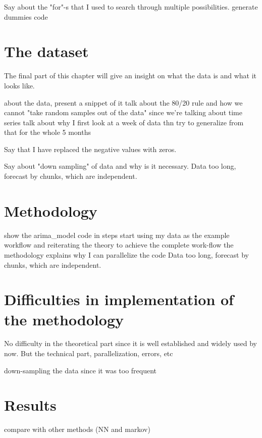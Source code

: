 \documentclass[12pt,a4paper,titlepage]{report}
\begin{document}
Say about the "for"-s that I used to search through multiple possibilities.
generate dummies code


\section{The dataset}
The final part of this chapter will give an insight on what the data is and what it looks like.

about the data, present a snippet of it
talk about the 80/20 rule and how we cannot "take random samples out of the data" since we're talking about time series
talk about why I first look at a week of data thn try to generalize from that for the whole 5 months

Say that I have replaced the negative values with zeros.

Say about "down sampling" of data and why is it necessary.
Data too long, forecast by chunks, which are independent.

\section{Methodology} \label{methodologysection}

show the arima\_model code in steps
start using my data as the example workflow and reiterating the theory to achieve the complete work-flow
the methodology explains why I can parallelize the code
Data too long, forecast by chunks, which are independent.

\section{Difficulties in implementation of the methodology}
No difficulty in the theoretical part since it is well established and widely used by now.
But the technical part, parallelization, errors, etc

down-sampling the data since it was too frequent

\section{Results}


compare with other methods (NN and markov)
\end{document}
